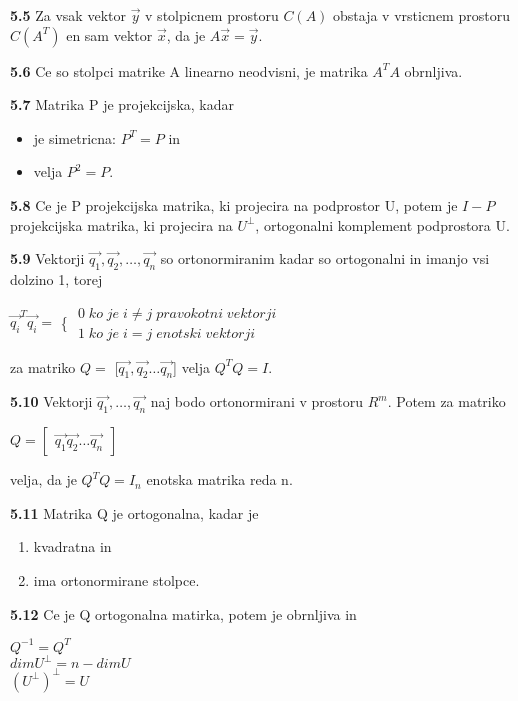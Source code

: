 \documentclass{article}
\begin{document}
\begin{multicols}{4}
\textbf{5.5} Za vsak vektor $\vec{y}$ v stolpicnem prostoru $C(A)$ obstaja v vrsticnem prostoru $C(A^{T})$ en sam
vektor $\vec{x}$, da je $A\vec{x} = \vec{y}$.

\textbf{5.6} Ce so stolpci matrike A linearno neodvisni, je matrika $A^{T}A$ obrnljiva.

\textbf{5.7} Matrika P je projekcijska, kadar
\begin{itemize}
    \item je simetricna: $P^{T} = P$ in
    \item velja $P^{2} = P$.
\end{itemize}

\textbf{5.8} Ce je P projekcijska matrika, ki projecira na podprostor U, potem je $I -P$ projekcijska
matrika, ki projecira na $U^{\perp}$, ortogonalni komplement podprostora U.

\textbf{5.9} Vektorji $\vec{q_{1}}, \vec{q_{2}}, \dots, \vec{q_{n}}$ so ortonormiranim kadar so ortogonalni in imanjo vsi
dolzino 1, torej
\begin{center}
    $\vec{q_{i}}^{T}\vec{q_{i}} = $ \Bigg\{ 
    $\begin{matrix}
        0\;  ko\; je\; i \neq j\; pravokotni\; vektorji\\
        1\;  ko\; je\; i = j\; enotski\; vektorji
    \end{matrix}$
\end{center}
za matriko $Q =$ [$\vec{q_{1}}, \vec{q_{2}} \dots \vec{q_{n}}$]  velja $Q^{T}Q = I$.

\textbf{5.10} Vektorji $\vec{q_{1}}, \dots, \vec{q_{n}}$ naj bodo ortonormirani v prostoru $R^{m}$. Potem
za matriko
\begin{center}
    $Q = \begin{bmatrix}
        \vec{q_{1}} \vec{q_{2}} \dots \vec{q_{n}}
    \end{bmatrix}$
\end{center}
velja, da je $Q^{T}Q = I_{n}$ enotska matrika reda n.

\textbf{5.11} Matrika Q je ortogonalna, kadar je
\begin{enumerate}
    \item kvadratna in
    \item ima ortonormirane stolpce.
\end{enumerate}

\textbf{5.12} Ce je Q ortogonalna matirka, potem je obrnljiva in
\begin{center}
    $Q^{-1} = Q^{T}$\\
    $dimU^{\perp} = n - dimU$\\
    $(U^{\perp})^{\perp} = U$
\end{center}


\end{multicols}
\end{document}
